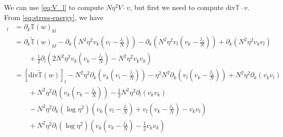 \documentclass[a4paper]{article}
\renewcommand{\div}{\mathrm{div}}
\begin{document}
We can use \eqref{eq:V_l} to compute $N \eta^2 V \cdot v$, but first we need to compute $\div \mathbb{T} \cdot v$.
From \eqref{eq:stress-energy}, we have
\begin{align}
  [ \div \mathbb{T} (w) ]_l &= \partial_k \mathbb{T}(w)_{kl} \nonumber \\
  &= \partial_k \tilde{\mathbb{T}}(w)_{kl} - \partial_k \left( N^2 \eta^2 v_k \left( v_l - \frac{j_l}{N} \right) \right) - \partial_k \left( N^2
  \eta^2 v_l \left( v_k - \frac{j_k}{N} \right) \right) + \partial_k ( N^2 \eta^2 v_k v_l ) \nonumber \\
  &\quad \quad + \frac{1}{2} \partial_l \left( 2 N^2 \eta^2 v_k \left( v_k - \frac{j_k}{N} \right) - N^2 \eta^2 v_k v_k \right) \nonumber \\
  &= [ \div \tilde{\mathbb{T}}(w) ]_l - N^2 \eta^2 \partial_k \left( v_k \left( v_l - \frac{j_l}{N} \right) \right) - \eta^2 N^2 \partial_k \left( v_l
  \left( v_k - \frac{j_k}{N} \right) \right) + N^2 \eta^2 \partial_k (v_k v_l) \nonumber \\
  &\quad \quad + N^2 \eta^2 \partial_l \left( v_k \left( v_k - \frac{j_k}{N} \right) \right) - \frac{1}{2} N^2 \eta^2 \partial_l (v_k v_k) \nonumber \\
  &\quad \quad - N^2 \eta^2 \partial_k (\log \eta^2) \left( v_k \left( v_l - \frac{j_l}{N} \right) + v_l \left( v_k - \frac{j_k}{N} \right) -
  v_k v_l \right) \nonumber \\
  &\quad \quad + N^2 \eta^2 \partial_l (\log \eta^2) \left( v_k \left( v_k - \frac{j_k}{N} \right) - \frac{1}{2} v_k v_k \right)
  \label{eq:div_stress-energy}
\end{align}
\end{document}
